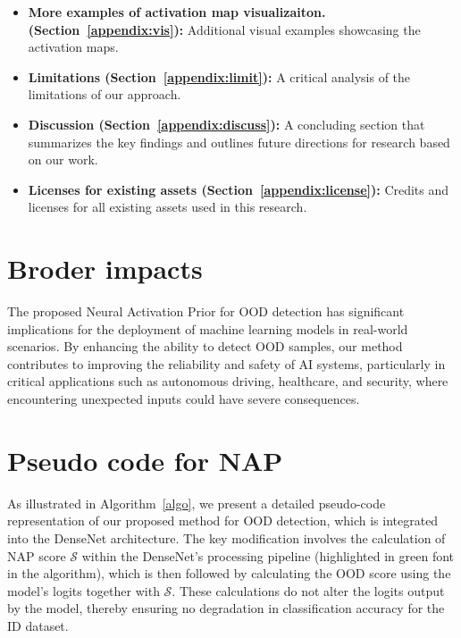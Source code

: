 \begin{itemize}
      \item \textbf{More examples of activation map visualizaiton. (Section~\ref{appendix:vis}):} Additional visual examples showcasing the activation maps.
      \item \textbf{Limitations (Section~\ref{appendix:limit}):} A critical analysis of the limitations of our approach.
    \item \textbf{Discussion (Section~\ref{appendix:discuss}):} A concluding section that summarizes the key findings and outlines future directions for research based on our work.
    \item \textbf{Licenses for existing assets (Section~\ref{appendix:license}):} Credits and licenses for all existing assets used in this research.
\end{itemize}
\section{Broder impacts}
\label{appendix:impacts}
The proposed Neural Activation Prior for OOD detection has significant implications for the deployment of machine learning models in real-world scenarios. By enhancing the ability to detect OOD samples, our method contributes to improving the reliability and safety of AI systems, particularly in critical applications such as autonomous driving, healthcare, and security, where encountering unexpected inputs could have severe consequences.
\section{Pseudo code for NAP}
\label{appendix:pseudo}
As illustrated in Algorithm~\ref{algo}, we present a detailed pseudo-code representation of our proposed method for OOD detection, which is integrated into the DenseNet architecture. The key modification involves the calculation of NAP score $\mathcal{S}$ within the DenseNet's processing pipeline (\textcolor{highlightcolor}{highlighted in green font in the algorithm}), which is then followed by calculating the OOD score using the model's logits together with $\mathcal{S}$. These calculations do not alter the logits output by the model, thereby ensuring no degradation in classification accuracy for the ID dataset. 

